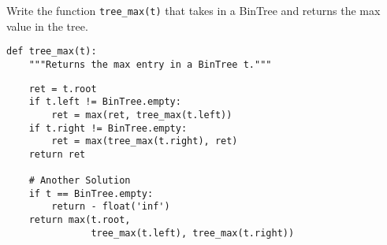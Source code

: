 \question Write the function \texttt{tree\_max(t)} that
takes in a BinTree and returns the max value in the tree.

\begin{lstlisting}
def tree_max(t):
    """Returns the max entry in a BinTree t."""
\end{lstlisting}
\begin{solution}[1.75in]
\begin{lstlisting}
    ret = t.root
    if t.left != BinTree.empty:
        ret = max(ret, tree_max(t.left))
    if t.right != BinTree.empty:
        ret = max(tree_max(t.right), ret)
    return ret

    # Another Solution
    if t == BinTree.empty:
        return - float('inf')
    return max(t.root,
               tree_max(t.left), tree_max(t.right))
\end{lstlisting}
\end{solution}

